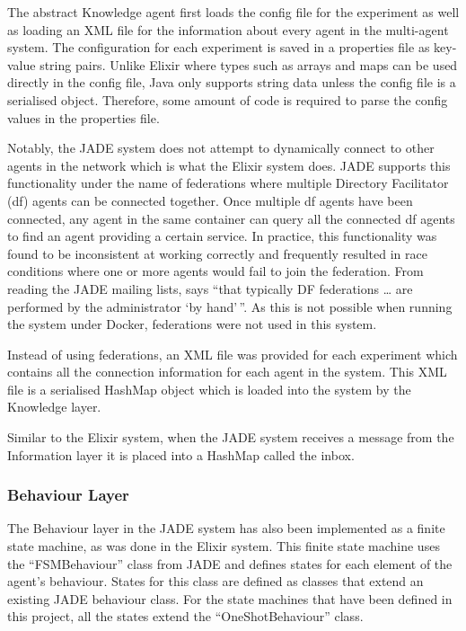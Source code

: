 The abstract Knowledge agent first loads the config file for the experiment as well as loading an XML file for the information about every agent in the multi-agent system.
The configuration for each experiment is saved in a properties file as key-value string pairs.
Unlike Elixir where types such as arrays and maps can be used directly in the config file, Java only supports string data unless the config file is a serialised object.
Therefore, some amount of code is required to parse the config values in the properties file.

Notably, the JADE system does not attempt to dynamically connect to other agents in the network which is what the Elixir system does.
JADE supports this functionality under the name of federations where multiple Directory Facilitator (df) agents can be connected together.
Once multiple df agents have been connected, any agent in the same container can query all the connected df agents to find an agent providing a certain service.
In practice, this functionality was found to be inconsistent at working correctly and frequently resulted in race conditions where one or more agents would fail to join the federation.
From reading the JADE mailing lists,  says ``that typically DF federations \dots{} are performed by the administrator `by hand'\,''.
As this is not possible when running the system under Docker, federations were not used in this system.

Instead of using federations, an XML file was provided for each experiment which contains all the connection information for each agent in the system.
This XML file is a serialised HashMap object which is loaded into the system by the Knowledge layer.

Similar to the Elixir system, when the JADE system receives a message from the Information layer it is placed into a HashMap called the inbox.

\subsubsection{Behaviour Layer}

The Behaviour layer in the JADE system has also been implemented as a finite state machine, as was done in the Elixir system.
This finite state machine uses the ``FSMBehaviour'' class from JADE and defines states for each element of the agent's behaviour.
States for this class are defined as classes that extend an existing JADE behaviour class.
For the state machines that have been defined in this project, all the states extend the ``OneShotBehaviour'' class.

